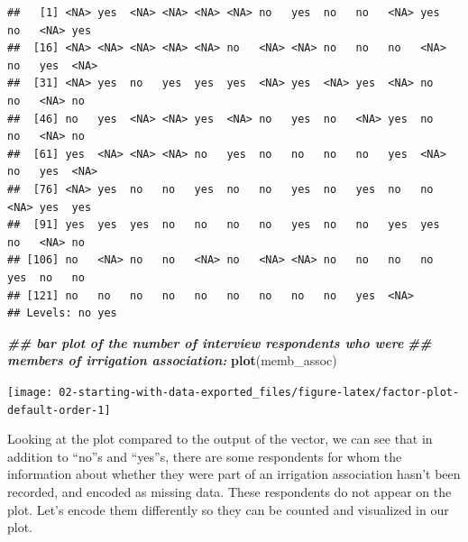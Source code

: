\documentclass[
]{article}
\newenvironment{Shaded}{\begin{snugshade}}{\end{snugshade}}
\newcommand{\DocumentationTok}[1]{\textcolor[rgb]{0.56,0.35,0.01}{\textbf{\textit{#1}}}}
\newcommand{\FunctionTok}[1]{\textcolor[rgb]{0.13,0.29,0.53}{\textbf{#1}}}
\newcommand{\NormalTok}[1]{#1}
\newcommand{\OtherTok}[1]{\textcolor[rgb]{0.56,0.35,0.01}{#1}}
\newcommand{\SpecialCharTok}[1]{\textcolor[rgb]{0.81,0.36,0.00}{\textbf{#1}}}
\newcommand{\StringTok}[1]{\textcolor[rgb]{0.31,0.60,0.02}{#1}}
\begin{document}
\begin{verbatim}
##   [1] <NA> yes  <NA> <NA> <NA> <NA> no   yes  no   no   <NA> yes  no   <NA> yes 
##  [16] <NA> <NA> <NA> <NA> <NA> no   <NA> <NA> no   no   no   <NA> no   yes  <NA>
##  [31] <NA> yes  no   yes  yes  yes  <NA> yes  <NA> yes  <NA> no   no   <NA> no  
##  [46] no   yes  <NA> <NA> yes  <NA> no   yes  no   <NA> yes  no   no   <NA> no  
##  [61] yes  <NA> <NA> <NA> no   yes  no   no   no   no   yes  <NA> no   yes  <NA>
##  [76] <NA> yes  no   no   yes  no   no   yes  no   yes  no   no   <NA> yes  yes 
##  [91] yes  yes  yes  no   no   no   no   yes  no   no   yes  yes  no   <NA> no  
## [106] no   <NA> no   no   <NA> no   <NA> <NA> no   no   no   no   yes  no   no  
## [121] no   no   no   no   no   no   no   no   no   yes  <NA>
## Levels: no yes
\end{verbatim}

\begin{Shaded}
\begin{Highlighting}[]
\DocumentationTok{\#\# bar plot of the number of interview respondents who were}
\DocumentationTok{\#\# members of irrigation association:}
\FunctionTok{plot}\NormalTok{(memb\_assoc)}
\end{Highlighting}
\end{Shaded}

\texttt{[image: 02-starting-with-data-exported\_files/figure-latex/factor-plot-default-order-1]}

Looking at the plot compared to the output of the vector, we can see
that in addition to ``no''s and ``yes''s, there are some respondents for
whom the information about whether they were part of an irrigation
association hasn't been recorded, and encoded as missing data. These
respondents do not appear on the plot. Let's encode them differently so
they can be counted and visualized in our plot.

\begin{Shaded}
\end{Shaded}
\end{document}
